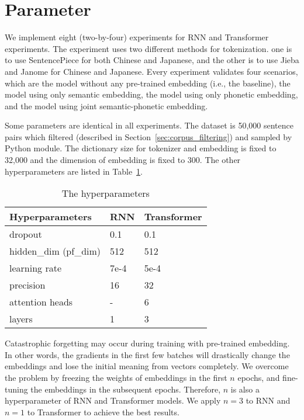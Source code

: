 \section{Parameter} \label{sec:parameter}

We implement eight (two-by-four) experiments for RNN and Transformer experiments. The experiment uses two different methods for tokenization. one is to use SentencePiece for both Chinese and Japanese, and the other is to use Jieba and Janome for Chinese and Japanese. Every experiment validates four scenarios, which are the model without any pre-trained embedding (i.e., the baseline), the model using only semantic embedding, the model using only phonetic embedding, and the model using joint semantic-phonetic embedding.

Some parameters are identical in all experiments. The dataset is 50,000 sentence pairs which filtered (described in Section~\ref{sec:corpus_filtering}) and sampled by Python  module. The dictionary size for tokenizer and embedding is fixed to 32,000 and the dimension of embedding is fixed to 300. The other hyperparameters are listed in Table~\ref{tab:hyperparameters}.

\vspace{0.4cm}
\begin{table}[h]
    \centering
    \begin{tabularx}{\textwidth}{bbb}\toprule
        Hyperparameters & RNN & Transformer \\\midrule
        dropout & 0.1 & 0.1 \\
        hidden\_dim (pf\_dim) & 512 & 512 \\
        learning rate & 7e-4 & 5e-4 \\
        precision & 16 & 32 \\
        attention heads & - & 6 \\
        layers & 1 & 3 \\ 
        \bottomrule
    \end{tabularx}
    \caption{The hyperparameters}
    \label{tab:hyperparameters}
\end{table}

Catastrophic forgetting \cite{kirkpatrick2017overcoming} may occur during training with pre-trained embedding. In other words, the gradients in the first few batches will drastically change the embeddings and lose the initial meaning from vectors completely. We overcome the problem by freezing the weights of embeddings in the first $n$ epochs, and fine-tuning the embeddings in the subsequent epochs. Therefore, $n$ is also a hyperparameter of RNN and Transformer models. We apply $n=3$ to RNN and $n=1$ to Transformer to achieve the best results.

